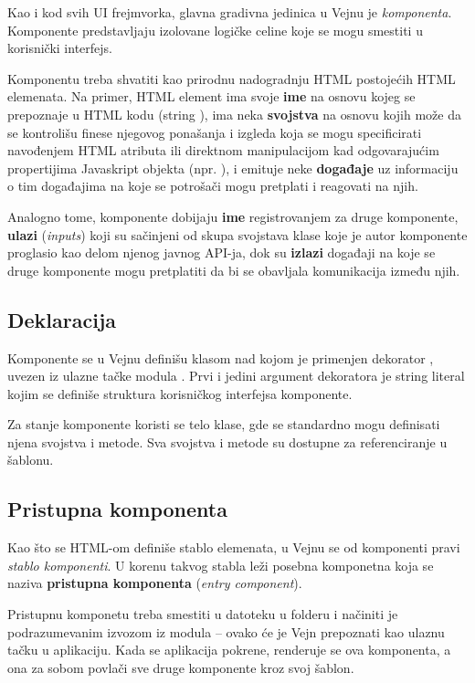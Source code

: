 Kao i kod svih UI frejmvorka, glavna gradivna jedinica u Vejnu je \emph{komponenta}.
Komponente predstavljaju izolovane logičke celine koje se mogu smestiti u korisnički interfejs.

Komponentu treba shvatiti kao prirodnu nadogradnju HTML postojećih HTML elemenata.
Na primer, HTML element  ima svoje \textbf{ime} na osnovu kojeg se prepoznaje u HTML kodu (string ), ima neka \textbf{svojstva} na osnovu kojih može da se kontrolišu finese njegovog ponašanja i izgleda koja se mogu specificirati navođenjem HTML atributa ili direktnom manipulacijom kad odgovarajućim propertijima Javaskript objekta (npr. ), i emituje neke \textbf{događaje} uz informaciju o tim događajima na koje se potrošači mogu pretplati i reagovati na njih.

Analogno tome, komponente dobijaju \textbf{ime} registrovanjem za druge komponente, \textbf{ulazi} (\textsl{inputs}) koji su sačinjeni od skupa svojstava klase koje je autor komponente proglasio kao delom njenog javnog API-ja, dok su \textbf{izlazi} događaji na koje se druge komponente mogu pretplatiti da bi se obavljala komunikacija između njih.

\subsection{Deklaracija}

Komponente se u Vejnu definišu klasom nad kojom je primenjen dekorator , uvezen iz ulazne tačke modula .
Prvi i jedini argument dekoratora je string literal kojim se definiše struktura korisničkog interfejsa komponente.

Za stanje komponente koristi se telo klase, gde se standardno mogu definisati njena svojstva i metode.
Sva svojstva i metode su dostupne za referenciranje u šablonu.

\subsection{Pristupna komponenta}
\label{subsec:pristupna-komponenta}

Kao što se HTML-om definiše stablo elemenata, u Vejnu se od komponenti pravi \emph{stablo komponenti}.
U korenu takvog stabla leži posebna komponetna koja se naziva \textbf{pristupna komponenta} (\textsl{entry component}).

Pristupnu komponetu treba smestiti u datoteku  u folderu  i načiniti je podrazumevanim izvozom iz modula -- ovako će je Vejn prepoznati kao ulaznu tačku u aplikaciju.
Kada se aplikacija pokrene, renderuje se ova komponenta, a ona za sobom povlači sve druge komponente kroz svoj šablon.

